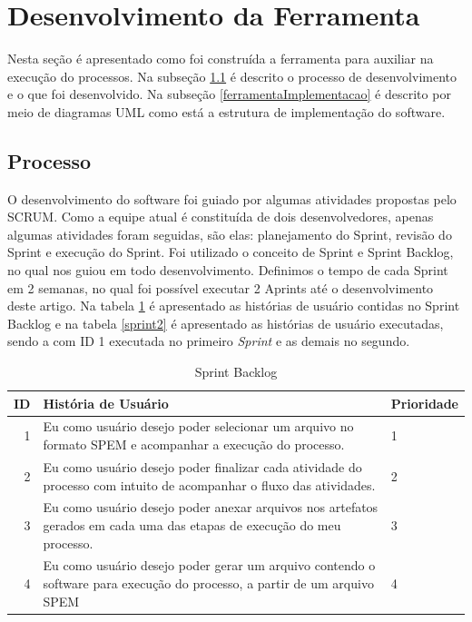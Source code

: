 \section{Desenvolvimento da Ferramenta}\label{ferramentaDeModelagemColabvorativa}
Nesta seção é apresentado como foi construída a ferramenta para auxiliar na execução do processos. Na subseção \ref{ferramentaProcesso} é descrito o processo de desenvolvimento e o que foi desenvolvido. Na subseção \ref{ferramentaImplementacao} é descrito por meio de diagramas UML como está a estrutura de implementação do software.
\subsection{Processo}\label{ferramentaProcesso}
O desenvolvimento do software foi guiado por algumas atividades propostas pelo SCRUM. Como a equipe atual é constituída de dois desenvolvedores, apenas algumas atividades foram seguidas, são elas: planejamento do Sprint, revisão do Sprint e execução do Sprint.
Foi utilizado o conceito de Sprint e Sprint Backlog, no qual nos guiou em todo desenvolvimento. Definimos o tempo de cada Sprint em 2 semanas, no qual foi possível executar 2 Aprints até o desenvolvimento deste artigo. Na tabela \ref{sprintbacklog} é apresentado as histórias de usuário contidas no Sprint Backlog e na tabela \ref{sprint2} é apresentado as histórias de usuário executadas, sendo a com ID 1 executada no primeiro \textit{Sprint} e as demais no segundo.
\begin{table}[!htb]
	\centering
	\caption{Sprint Backlog}
		\label{sprintbacklog}
	\vspace{0.5cm}
	\begin{tabular}{r|p{11cm}|p{2cm}}
		
		ID & História de Usuário & Prioridade \\ %
		\hline                               %
		1 & Eu como usuário desejo poder selecionar um arquivo no formato SPEM e acompanhar a execução do processo.        & 1 \\
				\hline 
		2 & Eu como usuário desejo poder finalizar cada atividade do processo com intuito de acompanhar o fluxo das atividades.  & 2 \\
				\hline 
		3 & Eu como usuário desejo poder anexar arquivos nos artefatos gerados em cada uma das etapas de execução do meu processo.           & 3 \\
				\hline 
		4 & Eu como usuário desejo poder gerar um arquivo contendo o software para execução do processo, a partir de um arquivo SPEM        & 4 \\         %
		
	\end{tabular}
\end{table}

